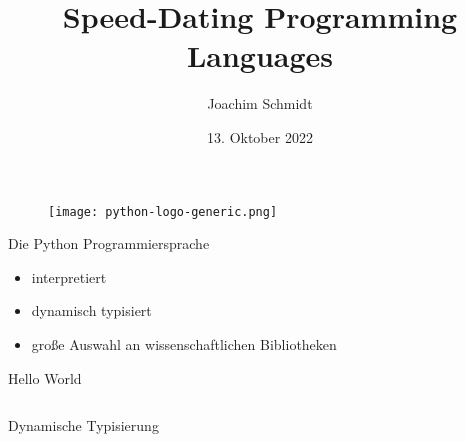 \documentclass[aspectratio=169]{beamer}
\title{Speed-Dating Programming Languages}
\author{Joachim Schmidt}
\date{13. Oktober 2022}
\begin{document}
%
%
%
%



\begin{frame}{}
  \begin{figure}
    \centering
    \texttt{[image: python-logo-generic.png]}
    \caption{\cite{python_logo}}
    \label{fig:python_logo}
  \end{figure}
\end{frame}

\begin{frame}{Die Python Programmiersprache}
  \begin{itemize}
  \item interpretiert
  \item dynamisch typisiert
  \item große Auswahl an wissenschaftlichen Bibliotheken
  \end{itemize}
\end{frame}

\begin{frame}{Hello World}
  \inputminted[linenos]{python}{examples/hello.py}
\end{frame}

\begin{frame}{Dynamische Typisierung}
  \inputminted[linenos,fontsize=\scriptsize]{python}{examples/dynamic_typing.py}
\end{frame}
\end{document}
